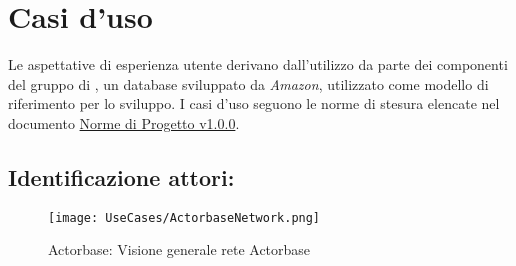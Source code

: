 \documentclass{scalatekids-article}
\begin{document}
\section{Casi d'uso}
Le aspettative di esperienza utente derivano dall'utilizzo da parte dei
componenti del gruppo di , un database 
sviluppato da \textit{Amazon}, utilizzato come modello di riferimento per lo
sviluppo. I casi d'uso seguono le norme di stesura elencate nel documento \href{run:../Interni/NormediProgetto\_v1.0.0.pdf}{Norme di Progetto v1.0.0}.%
\subsection{Identificazione attori:}
\begin{figure}[H]
  \begin{center}
    \texttt{[image: UseCases/ActorbaseNetwork.png]}
    \caption{Actorbase: Visione generale rete Actorbase}
  \end{center}
\end{figure}
\end{document}

